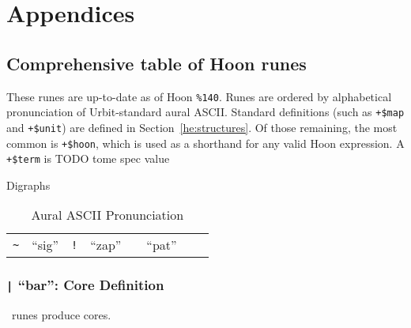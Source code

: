 \setchapterpreamble[u]{\margintoc}
\chapter{Appendices}


\section{Comprehensive table of Hoon runes}

These runes are up-to-date as of Hoon \texttt{\%140}.  Runes are ordered by alphabetical pronunciation of Urbit-standard aural ASCII.  Standard definitions (such as \texttt{+\$map} and \texttt{+\$unit}) are defined in Section~\ref{he:structures}.  Of those remaining, the most common is \texttt{+\$hoon}, which is used as a shorthand for any valid Hoon expression.  A \texttt{+\$term} is TODO tome spec value

Digraphs

\begin{table}
  \caption{Aural ASCII Pronunciation}
  \label{}
  \begin{tabular}{clclclcl}
    \texttt{\textasciitilde} & “sig” &
    \texttt{!} & “zap” &
    \texttt{\@} & “pat” \\
  \end{tabular}
\end{table}

\subsection{\texttt{|} “bar”:  Core Definition}

\pbar~runes produce cores.

